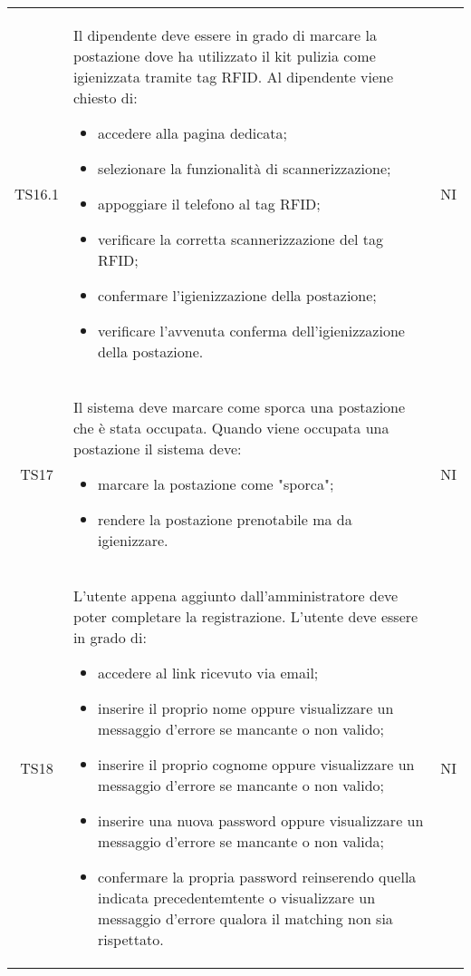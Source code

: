{\begin{longtable}{ c C{11cm} c }
        TS16.1&
        \begin{flushleft}
            Il dipendente deve essere in grado di marcare la postazione dove ha utilizzato il kit pulizia come igienizzata tramite tag RFID.
            Al dipendente viene chiesto di:
        \end{flushleft}
        \begin{itemize}
            \item accedere alla pagina dedicata;
            \item selezionare la funzionalità di scannerizzazione;
            \item appoggiare il telefono al tag RFID;
            \item verificare la corretta scannerizzazione del tag RFID;
            \item confermare l'igienizzazione della postazione;
            \item verificare l'avvenuta conferma dell'igienizzazione della postazione.
        \end{itemize}&
        NI\\

        TS17&
        \begin{flushleft}
            Il sistema deve marcare come sporca una postazione che \`{e} stata occupata.
            Quando viene occupata una postazione il sistema deve:
        \end{flushleft}
        \begin{itemize}
            \item marcare la postazione come "sporca";
            \item rendere la postazione prenotabile ma da igienizzare.
        \end{itemize}&
        NI\\

        TS18&
        \begin{flushleft}
            L'utente appena aggiunto dall'amministratore deve poter completare la registrazione.
            L'utente deve essere in grado di:
        \end{flushleft}
        \begin{itemize}
            \item accedere al link ricevuto via email;
            \item inserire il proprio nome oppure visualizzare un messaggio d'errore se mancante o non valido;
            \item inserire il proprio cognome oppure visualizzare un messaggio d'errore se mancante o non valido;
            \item inserire una nuova password oppure visualizzare un messaggio d'errore se mancante o non valida;
            \item confermare la propria password reinserendo quella indicata precedentemtente o visualizzare un messaggio d'errore qualora il matching non sia rispettato.
        \end{itemize}&
        NI\\


\end{longtable}}
